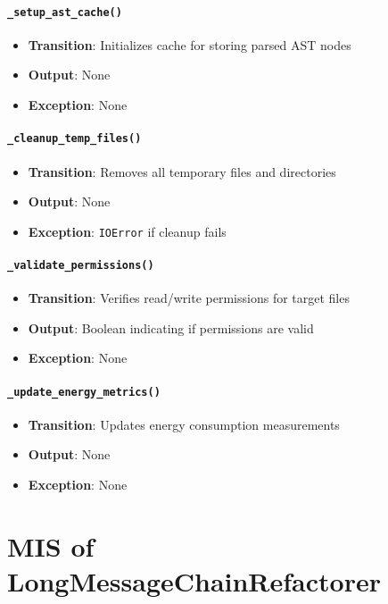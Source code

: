 \documentclass[12pt, titlepage]{article}
\begin{document}
\paragraph{\texttt{\_setup\_ast\_cache()}}
\begin{itemize}
  \item \textbf{Transition}: Initializes cache for storing parsed AST nodes
  \item \textbf{Output}: None
  \item \textbf{Exception}: None
\end{itemize}

\paragraph{\texttt{\_cleanup\_temp\_files()}}
\begin{itemize}
  \item \textbf{Transition}: Removes all temporary files and directories
  \item \textbf{Output}: None
  \item \textbf{Exception}: \texttt{IOError} if cleanup fails
\end{itemize}

\paragraph{\texttt{\_validate\_permissions()}}
\begin{itemize}
  \item \textbf{Transition}: Verifies read/write permissions for target files
  \item \textbf{Output}: Boolean indicating if permissions are valid
  \item \textbf{Exception}: None
\end{itemize}

\paragraph{\texttt{\_update\_energy\_metrics()}}
\begin{itemize}
  \item \textbf{Transition}: Updates energy consumption measurements
  \item \textbf{Output}: None
  \item \textbf{Exception}: None
\end{itemize}

\newpage

\section{MIS of LongMessageChainRefactorer} \label{mis:LMC}
\end{document}
